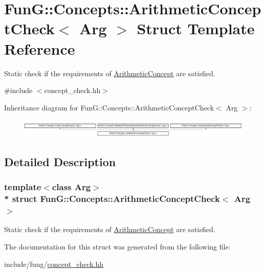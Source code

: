 \hypertarget{structFunG_1_1Concepts_1_1ArithmeticConceptCheck}{}\section{FunG\+:\+:Concepts\+:\+:Arithmetic\+Concept\+Check$<$ Arg $>$ Struct Template Reference}
\label{structFunG_1_1Concepts_1_1ArithmeticConceptCheck}


Static check if the requirements of \hyperlink{structFunG_1_1Concepts_1_1ArithmeticConcept}{Arithmetic\+Concept} are satisfied.  




{\ttfamily \#include $<$concept\+\_\+check.\+hh$>$}

Inheritance diagram for FunG\+:\+:Concepts\+:\+:Arithmetic\+Concept\+Check$<$ Arg $>$\+:\begin{figure}[H]
\begin{center}
\leavevmode
\includegraphics[height=0.893142cm]{structFunG_1_1Concepts_1_1ArithmeticConceptCheck}
\end{center}
\end{figure}


\subsection{Detailed Description}
\subsubsection*{template$<$class Arg$>$\\*
struct Fun\+G\+::\+Concepts\+::\+Arithmetic\+Concept\+Check$<$ Arg $>$}

Static check if the requirements of \hyperlink{structFunG_1_1Concepts_1_1ArithmeticConcept}{Arithmetic\+Concept} are satisfied. 

The documentation for this struct was generated from the following file\+:\begin{DoxyCompactItemize}
\item 
include/fung/\hyperlink{concept__check_8hh}{concept\+\_\+check.\+hh}\end{DoxyCompactItemize}
